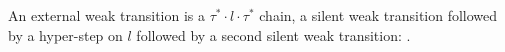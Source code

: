 \begin{definition}
  \label{def:weakstep}
  \leanok
  An external weak transition is a $\tau^\ast\!\cdot l\cdot\tau^\ast$ chain, a silent weak transition followed by a hyper-step on $l$ followed by a second silent weak transition: .
\end{definition}
